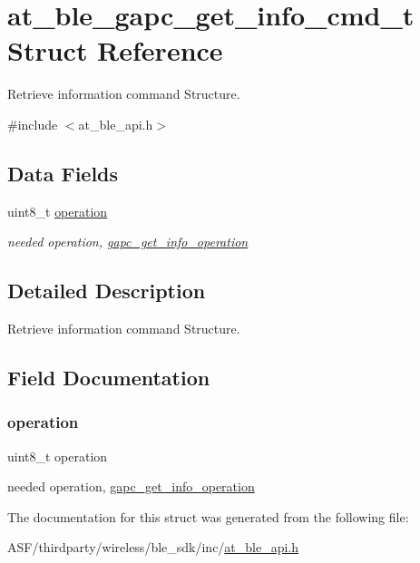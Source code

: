 \hypertarget{structat__ble__gapc__get__info__cmd__t}{}\section{at\+\_\+ble\+\_\+gapc\+\_\+get\+\_\+info\+\_\+cmd\+\_\+t Struct Reference}
\label{structat__ble__gapc__get__info__cmd__t}


Retrieve information command Structure.  




{\ttfamily \#include $<$at\+\_\+ble\+\_\+api.\+h$>$}

\subsection*{Data Fields}
\begin{DoxyCompactItemize}
\item 
uint8\+\_\+t \mbox{\hyperlink{structat__ble__gapc__get__info__cmd__t_a97d486d6926f9137837e1d8ecf0bbfdd}{operation}}
\begin{DoxyCompactList}\small\item\em needed operation, \mbox{\hyperlink{at__ble__api_8h_a2d6323d78f92f4d989850837f93b6aaf}{gapc\+\_\+get\+\_\+info\+\_\+operation}} \end{DoxyCompactList}\end{DoxyCompactItemize}


\subsection{Detailed Description}
Retrieve information command Structure. 

\subsection{Field Documentation}
\mbox{\label{structat__ble__gapc__get__info__cmd__t_a97d486d6926f9137837e1d8ecf0bbfdd}} 
\subsubsection{\texorpdfstring{operation}{operation}}
{\footnotesize\ttfamily uint8\+\_\+t operation}



needed operation, \mbox{\hyperlink{at__ble__api_8h_a2d6323d78f92f4d989850837f93b6aaf}{gapc\+\_\+get\+\_\+info\+\_\+operation}} 



The documentation for this struct was generated from the following file\+:\begin{DoxyCompactItemize}
\item 
A\+S\+F/thirdparty/wireless/ble\+\_\+sdk/inc/\mbox{\hyperlink{at__ble__api_8h}{at\+\_\+ble\+\_\+api.\+h}}\end{DoxyCompactItemize}
